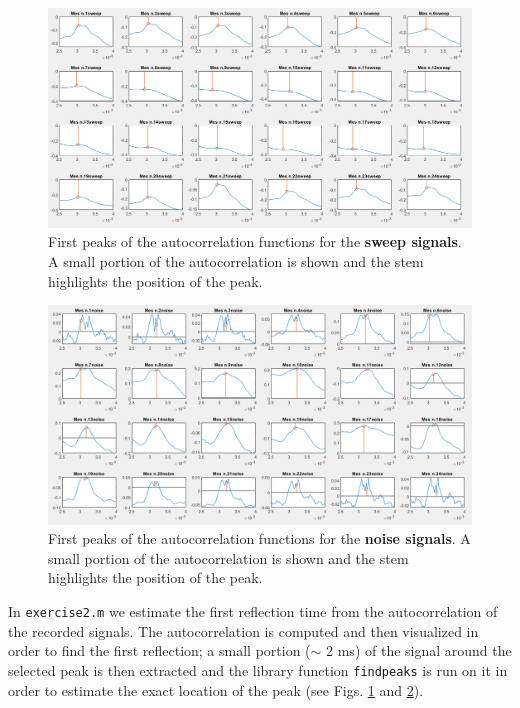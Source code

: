 \documentclass[a4paper]{article}
\begin{document}
\begin{figure}[h]
	\centering
	\includegraphics[width=0.85\linewidth]{sweep_peaks.png}
	\caption{First peaks of the autocorrelation functions for the \textbf{sweep signals}. A small portion of the autocorrelation is shown and the stem highlights the position of the peak.}
	\label{fig:sweepcorr}
\end{figure}

\begin{figure}[h]
	\centering
	\includegraphics[width=0.85\linewidth]{noise_peaks.png}
	\caption{First peaks of the autocorrelation functions for the \textbf{noise signals}. A small portion of the autocorrelation is shown and the stem highlights the position of the peak.}
	\label{fig:noisecorr}
\end{figure}


In \verb|exercise2.m| we estimate the first reflection time from the autocorrelation of the recorded signals. The autocorrelation is computed and then visualized in order to find the first reflection; a small portion ($\sim$ 2 ms) of the signal around the selected peak is then extracted and the library function \verb|findpeaks| is run on it in order to estimate the exact location of the peak (see Figs. \ref{fig:sweepcorr} and \ref{fig:noisecorr}).
\end{document}

